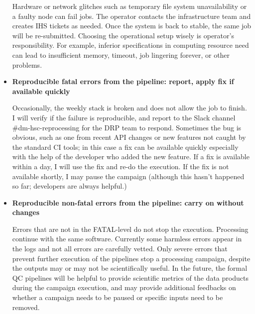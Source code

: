 \documentclass[DM,authoryear,toc]{lsstdoc}
\begin{document}
\begin{itemize}
  Hardware or network glitches such as temporary file system
  unavailability or a faulty node can fail jobs. The operator
  contacts the infrastructure team and creates IHS tickets as needed.
  Once the system is back to stable, the same job will be re-submitted.
  Choosing the operational setup wisely is operator’s responsibility.
  For example, inferior specifications in computing resource need
  can lead to insufficient memory, timeout, job lingering forever,
  or other problems.

  \item \textbf{Reproducible fatal errors from the pipeline: report,
  apply fix if available quickly}

  Occasionally, the weekly stack is broken and does not allow the
  job to finish.  I will verify if the failure is reproducible, and
  report to the Slack channel \#dm-hsc-reprocessing for the DRP team
  to respond.  Sometimes the bug is obvious, such as one from recent
  API changes or new features not caught by the standard CI tools;
  in this case a fix can be available quickly especially with the
  help of the developer who added the new feature.  If a fix is
  available within a day, I will use the fix and re-do the execution.
  If the fix is not available shortly, I may pause the campaign
  (although this hasn’t happened so far; developers are always
  helpful.)

  \item \textbf{Reproducible non-fatal errors from the pipeline:
  carry on without changes}

  Errors that are not in the FATAL-level do not stop the execution.
  Processing continue with the same software. Currently some harmless
  errors appear in the logs and not all errors are carefully vetted.
  Only severe errors that prevent further execution of the pipelines
  stop a processing campaign, despite the outputs may or may not
  be scientifically useful. In the future, the formal QC pipelines
  will be helpful to provide scientific metrics of the data products
  during the campaign execution, and may provide additional feedbacks
  on whether a campaign needs to be paused or specific inputs need
  to be removed.

\end{itemize}



\end{document}
